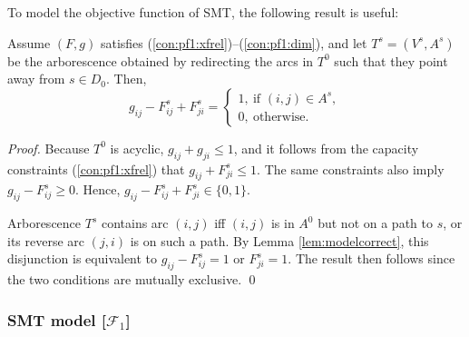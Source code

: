 To model the objective function of SMT, the following result is useful:
\begin{prop}\label{prop:transx}
Assume $(F,g)$ satisfies (\ref{con:pf1:xfrel})--(\ref{con:pf1:dim}),
and let $T^s=(V^s,A^s)$ be the arborescence obtained by redirecting the arcs in $T^0$ such that they point away from $s\in D_0$. 
Then,
$$
g_{ij} - F^s_{ij}+F^s_{ji} = 
	\begin{cases}
		1, ~\text{if $(i,j)\in A^s$}, \\
		0, ~\text{otherwise.}
	\end{cases}
$$
\end{prop}
%
\begin{proof}
Because $T^0$ is acyclic, $g_{ij}+g_{ji}\leq 1$, and it follows from the capacity constraints (\ref{con:pf1:xfrel}) that $g_{ij}+F^s_{ji}\leq 1$.
The same constraints also imply $g_{ij} - F^s_{ij}\geq 0$.
Hence, $g_{ij} - F^s_{ij}+F^s_{ji}\in\{0,1\}$.

Arborescence $T^s$ contains arc $(i,j)$ iff $(i,j)$ is in $A^0$ but not on a path to $s$, or its reverse arc $(j,i)$ is on such a path.
By Lemma \ref{lem:modelcorrect}, this disjunction is equivalent to $g_{ij}-F_{ij}^s=1$ or $F_{ji}^s=1$.
The result then follows since the two conditions are mutually exclusive.
\qed
\end{proof}


\subsubsection{SMT model [$\mathcal{F}_1$]}

